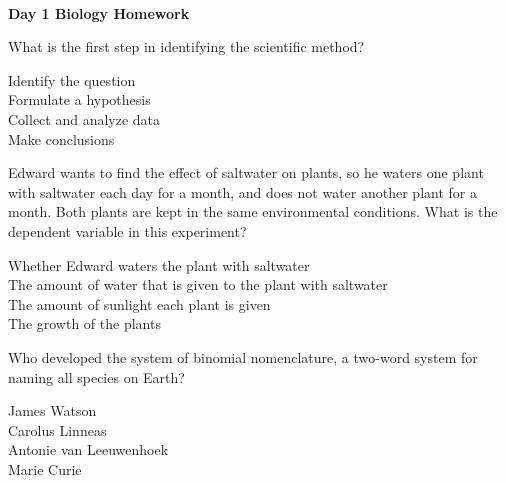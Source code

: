 \documentclass[a4paper,12pt]{exam}
\begin{document}
	
\begin{center}
	\\
	\vspace{5mm}
	{\LARGE \textbf{Day 1 Biology Homework}}
\end{center}

\vspace{1mm}

\vspace{5mm}


\begin{questions}
	\question What is the first step in identifying the scientific method?

	\begin{oneparchoices}
		\choice Identify the question
		\\
		\choice Formulate a hypothesis
		\\
		\choice Collect and analyze data
		\\		
		\choice Make conclusions
	\end{oneparchoices}

	\question Edward wants to find the effect of saltwater on plants, so he waters one plant with saltwater each day for a month, and does not water another plant for a month. Both plants are kept in the same environmental conditions. What is the dependent variable in this experiment?
	
	\begin{oneparchoices}
		\choice Whether Edward waters the plant with saltwater
		\\
		\choice The amount of water that is given to the plant with saltwater
		\\
		\choice The amount of sunlight each plant is given
		\\		
		\choice The growth of the plants
	\end{oneparchoices}

	\question Who developed the system of binomial nomenclature, a two-word system for naming all species on Earth?
	
	\begin{oneparchoices}
		\choice James Watson
		\\
		\choice Carolus Linneas
		\\
		\choice Antonie van Leeuwenhoek
		\\
		\choice Marie Curie
	\end{oneparchoices}


\end{questions}
\end{document}
